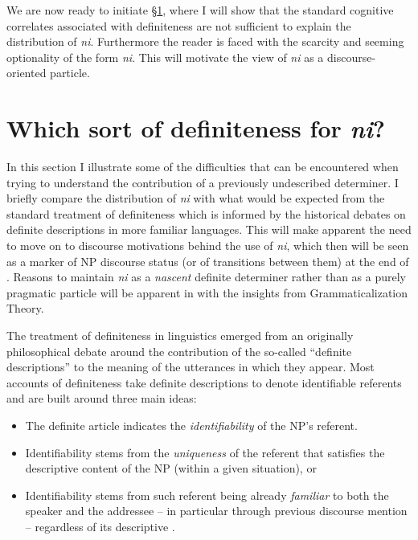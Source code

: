 \documentclass[output=paper
,modfonts
,nonflat]{langsci/langscibook}
\begin{document}
We are now ready to initiate \S\ref{sec:pico:2}, where I will show that the standard cognitive correlates associated with definiteness are not sufficient to explain the distribution of \textit{ni}. Furthermore the reader is faced with the scarcity and seeming optionality of the form \textit{ni}. This will motivate the view of \textit{ni} as a discourse-oriented particle.

\section{Which sort of definiteness for \textit{ni}?}\label{sec:pico:2}

In this section I illustrate some of the difficulties that can be encountered when trying to understand the contribution of a previously undescribed determiner. I briefly compare the distribution of \textit{ni} with what would be expected from the standard treatment of definiteness which is informed by the historical debates on definite descriptions in more familiar languages. This will make apparent the need to move on to discourse motivations behind the use of \textit{ni}, which then will be seen as a marker of NP discourse status (or of transitions between them) at the end of . Reasons to maintain \textit{ni} as a \textit{nascent} definite determiner rather than as a purely pragmatic particle will be apparent in  with the insights from Grammaticalization Theory.

The treatment of definiteness in linguistics emerged from an originally philosophical debate around the contribution of the so-called ``definite descriptions'' to the meaning of the utterances in which they appear. Most accounts of definiteness take definite descriptions to denote identifiable referents and are built around three main ideas:

\begin{itemize}
	\item The definite article indicates the \textit{identifiability} of the NP's referent.
	\item Identifiability stems from the \textit{uniqueness} of the referent that satisfies the descriptive content of the NP (within a given situation), or
	\item Identifiability stems from such referent being already \textit{familiar} to both the speaker and the addressee -- in particular through previous discourse mention -- regardless of its descriptive . 
\end{itemize} 
	
\end{document}
